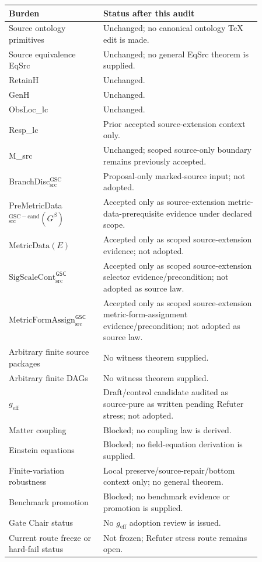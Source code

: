 \documentclass[11pt]{article}
\newcommand{\Gbeta}{G^\beta}
\newcommand{\SigScaleCont}{\mathrm{SigScaleCont}^{\mathsf{GSC}}_{\mathrm{src}}}
\newcommand{\MetricFormAssign}{\mathrm{MetricFormAssign}^{\mathsf{GSC}}_{\mathrm{src}}}
\newcommand{\geff}{g_{\mathrm{eff}}}
\begin{document}
\begin{longtable}{p{0.30\linewidth}p{0.56\linewidth}}
\toprule
Burden & Status after this audit \\
\midrule
Source ontology primitives & Unchanged; no canonical ontology TeX edit is made. \\
Source equivalence EqSrc & Unchanged; no general EqSrc theorem is supplied. \\
RetainH & Unchanged. \\
GenH & Unchanged. \\
ObsLoc\_lc & Unchanged. \\
Resp\_lc & Prior accepted source-extension context only. \\
M\_src & Unchanged; scoped source-only boundary remains previously accepted. \\
BranchDisc\(_{\mathrm{src}}^{\mathrm{GSC}}\) & Proposal-only marked-source input; not adopted. \\
PreMetricData\(_{\mathrm{src}}^{\mathrm{GSC-cand}}(\Gbeta)\) & Accepted only as source-extension metric-data-prerequisite evidence under declared scope. \\
\(\mathrm{MetricData}(E)\) & Accepted only as scoped source-extension evidence; not adopted. \\
\(\SigScaleCont\) & Accepted only as scoped source-extension selector evidence/precondition; not adopted as source law. \\
\(\MetricFormAssign\) & Accepted only as scoped source-extension metric-form-assignment evidence/precondition; not adopted as source law. \\
Arbitrary finite source packages & No witness theorem supplied. \\
Arbitrary finite DAGs & No witness theorem supplied. \\
\(\geff\) & Draft/control candidate audited as source-pure as written pending Refuter stress; not adopted. \\
Matter coupling & Blocked; no coupling law is derived. \\
Einstein equations & Blocked; no field-equation derivation is supplied. \\
Finite-variation robustness & Local preserve/source-repair/bottom context only; no general theorem. \\
Benchmark promotion & Blocked; no benchmark evidence or promotion is supplied. \\
Gate Chair status & No \(\geff\) adoption review is issued. \\
Current route freeze or hard-fail status & Not frozen; Refuter stress route remains open. \\
\bottomrule
\end{longtable}
\end{document}
